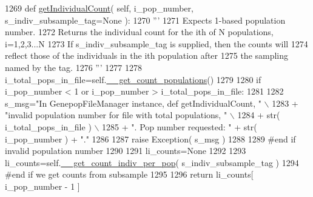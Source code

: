 \begin{DoxyCode}
1269     \textcolor{keyword}{def }\hyperlink{classnegui_1_1genepopfilemanager_1_1GenepopFileManager_a05e723069f5129b21a4d017c2a5317b0}{getIndividualCount}( self, i\_pop\_number, s\_indiv\_subsample\_tag=None ):
1270         \textcolor{stringliteral}{'''}
1271 \textcolor{stringliteral}{        Expects 1-based population number.}
1272 \textcolor{stringliteral}{        Returns the individual count for the ith of N populations, i=1,2,3...N}
1273 \textcolor{stringliteral}{        If s\_indiv\_subsample\_tag is supplied, then the counts will}
1274 \textcolor{stringliteral}{        reflect those of the individuals in the ith population after}
1275 \textcolor{stringliteral}{        the sampling named by the tag.}
1276 \textcolor{stringliteral}{        '''}
1277 
1278         i\_total\_pops\_in\_file=self.\hyperlink{classnegui_1_1genepopfilemanager_1_1GenepopFileManager_a51f6dcbd17c80f8e61114b11283b655f}{\_\_get\_count\_populations}()  
1279 
1280         \textcolor{keywordflow}{if} i\_pop\_number < 1 \textcolor{keywordflow}{or} i\_pop\_number > i\_total\_pops\_in\_file:
1281 
1282             s\_msg=\textcolor{stringliteral}{"In GenepopFileManager instance, def getIndividualCount, "} \(\backslash\)
1283                     + \textcolor{stringliteral}{"invalid population number for file with total populations, "} \(\backslash\)
1284                     + str( i\_total\_pops\_in\_file ) \(\backslash\)
1285                     + \textcolor{stringliteral}{".  Pop number requested: "} + str( i\_pop\_number ) + \textcolor{stringliteral}{"."}
1286 
1287             \textcolor{keywordflow}{raise} Exception( s\_msg )
1288 
1289         \textcolor{comment}{#end if  invalid population number}
1290 
1291         li\_counts=\textcolor{keywordtype}{None}
1292 
1293         li\_counts=self.\hyperlink{classnegui_1_1genepopfilemanager_1_1GenepopFileManager_a8efe11151549d7da2bc024f836491af4}{\_\_get\_count\_indiv\_per\_pop}( s\_indiv\_subsample\_tag )
1294         \textcolor{comment}{#end if we get counts from subsample}
1295 
1296         \textcolor{keywordflow}{return} li\_counts[ i\_pop\_number - 1 ]
\end{DoxyCode}
